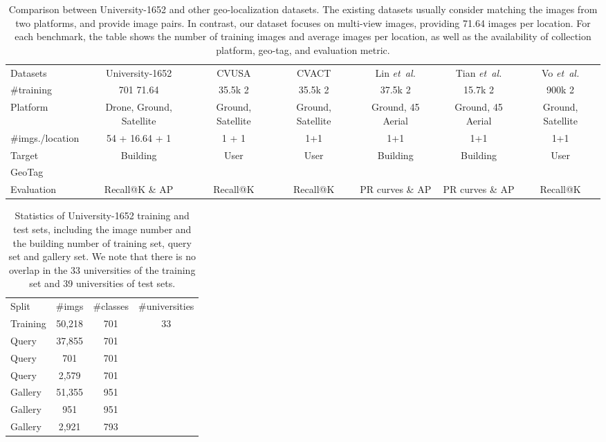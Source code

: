 \documentclass[sigconf]{acmart}
\def\etal{\emph{et~al.}}
\begin{document}
\setlength{\tabcolsep}{6pt}
\begin{table*}
\small
\begin{center}
\begin{tabular}{l|c|c|c|c|c|c}
\hline
Datasets & University-1652 & CVUSA \cite{zhai2017predicting} & CVACT \cite{liu2019lending}  & Lin \etal \cite{lin2015learning} & Tian \etal \cite{tian2017cross} & Vo \etal \cite{vo2016localizing}\\
\shline
\#training & 701  71.64 & 35.5k  2 & 35.5k  2 & 37.5k  2 & 15.7k  2 & 900k  2 \\
Platform     & Drone, Ground, Satellite &  Ground, Satellite  &  Ground, Satellite & Ground, 45 Aerial & Ground, 45 Aerial & Ground, Satellite \\
\#imgs./location  &  54 + 16.64 + 1 &  1 + 1  & 1+1 & 1+1 &  1+1 &  1+1 \\
Target     & Building &  User &  User & Building & Building & User \\
GeoTag     &   &  &   &   &  &  \\
Evaluation  & Recall@K \& AP & Recall@K & Recall@K & PR curves \& AP & PR curves \& AP  & Recall@K \\
\hline
\end{tabular}
\end{center}
\caption{Comparison between University-1652 and other geo-localization datasets. The existing datasets usually consider matching the images from two platforms, and provide image pairs. In contrast, our dataset focuses on multi-view images, providing 71.64 images per location. 
For each benchmark, the table shows the number of training images and average images per location, as well as the availability of collection platform, geo-tag, and evaluation metric.
}
\vspace{-.2in}
\label{table:Dataset}
\end{table*}

\setlength{\tabcolsep}{12pt}
\begin{table}
\small
\begin{center}
\begin{tabular}{l|c|c|c}
\hline
Split & \#imgs & \#classes & \#universities\\
\shline
 Training & 50,218 & 701 & 33 \\
 \hline
 Query & 37,855 & 701 &  \multirow{6}{0.1\linewidth}{\centering{39}}\\
 Query& 701 & 701 & \\
 Query & 2,579 & 701 & \\
 Gallery& 51,355 & 951 & \\
 Gallery & 951 & 951 & \\
 Gallery & 2,921 & 793 & \\
\hline
\end{tabular}
\end{center}
\caption{Statistics of University-1652 training and test sets, including the image number and the building number of training set, query set and gallery set. We note that there is no overlap in the 33 universities of the training set and 39 universities of test sets.
}
\label{table:Statistics}
\end{table}
\end{document}

